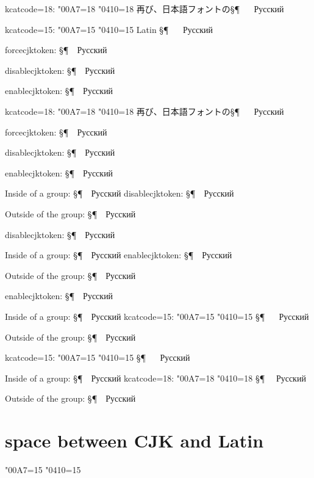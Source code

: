\documentclass{ujarticle}
\begin{document}
\bs kcatcode=18: 
\kcatcode\ucs"00A7=18%
\kcatcode\ucs"0410=18%
再び、日本語フォントの§¶
~~
Русский

\bs kcatcode=15: 
\kcatcode\ucs"00A7=15%
\kcatcode\ucs"0410=15%
Latin §¶
~~
\selectfont
Русский

\forcecjktoken
\bs forcecjktoken: 
§¶~~Русский

\disablecjktoken
\bs disablecjktoken: 
§¶~~Русский

\enablecjktoken
\bs enablecjktoken: 
§¶~~Русский

\bs kcatcode=18: 
\kcatcode\ucs"00A7=18%
\kcatcode\ucs"0410=18%
再び、日本語フォントの§¶
~~
Русский

\forcecjktoken
\bs forcecjktoken: 
§¶~~Русский

\disablecjktoken
\bs disablecjktoken: 
§¶~~Русский

\enablecjktoken
\bs enablecjktoken: 
§¶~~Русский


{ Inside of a group: 
§¶~~Русский
\quad
\disablecjktoken
\bs disablecjktoken: 
§¶~~Русский
}

Outside of the group:
§¶~~Русский


\disablecjktoken
\bs disablecjktoken: 
§¶~~Русский

{ Inside of a group: 
§¶~~Русский
\quad
\enablecjktoken
\bs enablecjktoken: 
§¶~~Русский
}

Outside of the group:
§¶~~Русский

\enablecjktoken
\bs enablecjktoken: 
§¶~~Русский

{ Inside of a group: 
\selectfont
§¶~~Русский
\quad
\bs kcatcode=15: 
\kcatcode\ucs"00A7=15%
\kcatcode\ucs"0410=15%
\selectfont
§¶
~~
\selectfont
Русский
}

Outside of the group:
§¶~~Русский

\bs kcatcode=15: 
\kcatcode\ucs"00A7=15%
\kcatcode\ucs"0410=15%
\selectfont
§¶
~~
\selectfont
Русский

{ Inside of a group: 
§¶~~Русский
\quad
\bs kcatcode=18: 
\kcatcode\ucs"00A7=18%
\kcatcode\ucs"0410=18%
\relax §¶~~%
Русский
}

Outside of the group:
§¶~~Русский


\newpage
\section{space between CJK and Latin}
\kcatcode\ucs"00A7=15%
\kcatcode\ucs"0410=15%
\end{document}
